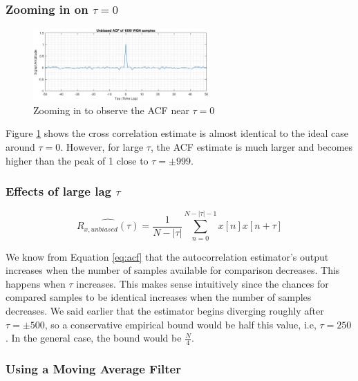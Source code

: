 \subsubsection{Zooming in on $\tau=0$}

\begin{figure}[h!]
\centering
\includegraphics[width=0.6\textwidth]{acf_uncorr_zoom}
\caption{\label{fig:acf_uncorr_zoom} Zooming in to observe the ACF near $\tau=0$}
\end{figure}

Figure \ref{fig:acf_uncorr_zoom} shows the cross correlation estimate is almost identical to the ideal case around $\tau=0$. However, for large $\tau$, the ACF estimate is much larger and becomes higher than the peak of 1 close to $\tau=\pm 999$.

\subsubsection{Effects of large lag $\tau$}

\begin{equation}
\hat{R_{x,unbiased}(\tau)}=\frac{1}{N-|\tau|} \sum_{n=0}^{N-|\tau|-1} x[n]x[n+\tau]
\label{eq:acf}
\end{equation}

We know from Equation \ref{eq:acf} that the autocorrelation estimator's output increases when the number of samples available for comparison decreases. This happens when $\tau$ increases. This makes sense intuitively since the chances for compared samples to be identical increases when the number of samples decreases. We said earlier that the estimator begins diverging roughly after $\tau=\pm500$, so a conservative empirical bound would be half this value, i.e, $\tau=250$. In the general case, the bound would be $\frac{N}{4}$.

\subsubsection{Using a Moving Average Filter}

